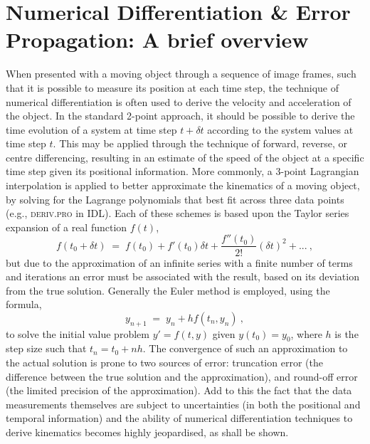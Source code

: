 \documentclass[referee]{aa}
\begin{document}
\section{Numerical Differentiation \& Error Propagation: A brief overview}
\label{sect:num_diff_errors}

When presented with a moving object through a sequence of image frames, such that it is possible to measure its position at each time step, the technique of numerical differentiation is often used to derive the velocity and acceleration of the object. In the standard 2-point approach, it should be possible to derive the time evolution of a system at time step $t+\delta t$ according to the system values at time step $t$. This may be applied through the technique of forward, reverse, or centre differencing, resulting in an estimate of the speed of the object at a specific time step given its positional information. More commonly, a 3-point Lagrangian interpolation is applied to better approximate the kinematics of a moving object, by solving for the Lagrange polynomials that best fit across three data points (e.g., \textsc{deriv.pro} in IDL). Each of these schemes is based upon the Taylor series expansion of a real function $f(t)$,
\begin{equation}
\label{taylor1}
f(t_0+\delta t) \; = \; f(t_0)+f'(t_0)\delta t +  \frac{f''(t_0)}{2!}(\delta t)^{2}  + ...\ ,
\end{equation}
but due to the approximation of an infinite series with a finite number of terms and iterations an error must be associated with the result, based on its deviation from the true solution. Generally the Euler method is employed, using the formula,
\begin{equation}
y_{n+1} \; = \; y_n + h f(t_n, y_n)\ ,
\end{equation}
to solve the initial value problem $y'=f(t,y)$ given $y(t_0)=y_0$, where $h$ is the step size such that $t_n=t_0+nh$. The convergence of such an approximation to the actual solution is prone to two sources of error: truncation error (the difference between the true solution and the approximation), and round-off error (the limited precision of the approximation). Add to this the fact that the data measurements themselves are subject to uncertainties (in both the positional and temporal information) and the ability of numerical differentiation techniques to derive kinematics becomes highly jeopardised, as shall be shown.
\end{document}
